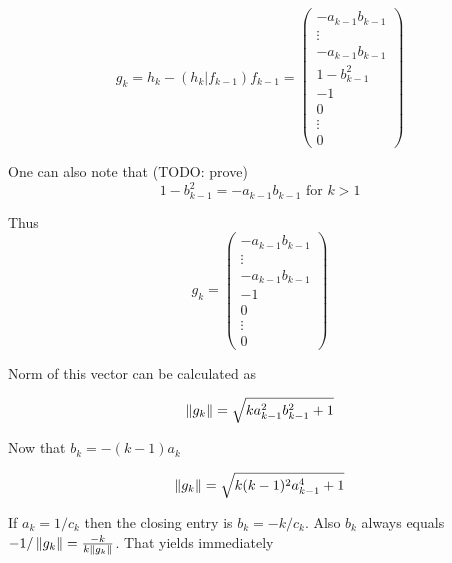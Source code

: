 \documentclass{article}
\begin{document}
$$g_k = h_k - \left(h_k|f_{k-1}\right) f_{k-1} =
\begin{pmatrix}
    - a_{k-1} b_{k-1} \\
    \vdots \\
    - a_{k-1} b_{k-1} \\
    1 - b_{k-1}^2     \\
    -1 \\
    0 \\
    \vdots \\
    0
\end{pmatrix}$$

One can also note that (TODO: prove)
$$1 - b_{k-1}^2 = - a_{k-1} b_{k-1} \text{ for } k>1$$

Thus
$$g_k =
\begin{pmatrix}
    - a_{k-1} b_{k-1} \\
    \vdots \\
    - a_{k-1} b_{k-1} \\
    -1 \\
    0 \\
    \vdots \\
    0
\end{pmatrix}$$

Norm of this vector can be calculated as

\providecommand{\fknorm}{\sqrt{k a_{k-1}^2 b_{k-1}^2 + 1}}
$$\norm{g_k} = \fknorm$$

Now that $b_k = -(k-1)a_k$

\renewcommand{\fknorm}{\sqrt{k(k-1)^2 a_{k-1}^4 + 1}}
$$\norm{g_k} = \fknorm$$

If $a_k = 1/c_k$ then the closing entry is $b_k = -k/c_k$.
Also $b_k$ always equals $-1/\left\|{g_k}\right\| = \frac{-k}{k\left\|{g_k}\right\|}$.
That yields immediately
\end{document}
